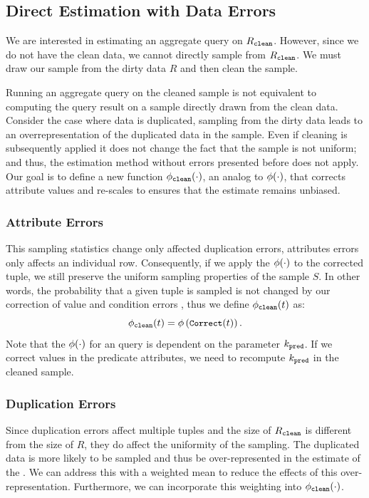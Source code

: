 \subsection{Direct Estimation with Data Errors}
We are interested in estimating an aggregate query on $R_{\texttt{clean} }$.
However, since we do not have the clean data, we cannot directly sample from $R_{\texttt{clean} }$.
We must draw our sample from the dirty data $R$ and then clean the sample.

Running an aggregate query on the cleaned sample is not equivalent to computing the query result on a sample directly drawn from the clean data.
Consider the case where data is duplicated, sampling from the dirty data leads to an overrepresentation of the duplicated data in the sample.
Even if cleaning is subsequently applied it does not change the fact that the sample is not uniform; and thus, the estimation method without errors presented before does not apply.
Our goal is to define a new function $\phi_{\texttt{clean} } (\cdot)$, an analog to $\phi (\cdot)$, that corrects attribute values and re-scales to ensures that the estimate remains unbiased.


\subsubsection{Attribute Errors}
This sampling statistics change only affected duplication errors, attributes errors only affects an individual row. 
Consequently, if we apply the $\phi (\cdot)$ to the corrected tuple, we still preserve the uniform sampling properties of the sample $S$.
In other words, the probability that a given tuple is sampled is not changed by our correction of value and condition errors , thus we define $\phi_{\texttt{clean} } (t)$ as:
\[\small
\phi_{\texttt{clean} } (t) = \phi  \left( \texttt{Correct}(t) \right).
\]
Note that the $\phi (\cdot)$ for an \avgfunc query is dependent on the parameter $k_{\texttt{pred} }$. 
If we correct values in the predicate attributes, we need to recompute $k_{\texttt{pred} }$ in the cleaned sample.

\subsubsection{Duplication Errors}
Since duplication errors affect multiple tuples and the size of $R_{\texttt{clean} }$ is different from the size of $R$, they do affect the uniformity of the sampling.
The duplicated data is more likely to be sampled and thus be over-represented in the estimate of the \mean.
We can address this with a weighted mean to reduce the effects of this over-representation.
Furthermore, we can incorporate this weighting into $\phi_{\texttt{clean} } (\cdot)$.

